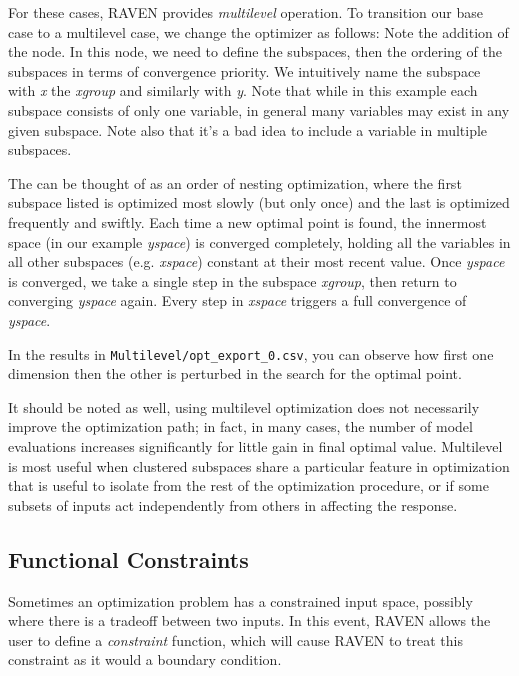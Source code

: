 For these cases, RAVEN provides \emph{multilevel} operation.  To transition our base case to a multilevel
case, we change the optimizer as follows:
Note the addition of the  node.  In this node, we need to define the subspaces, then the
ordering of the subspaces in terms of convergence priority.  We intuitively name the subspace with \emph{x}
the \emph{xgroup} and similarly with \emph{y}.  Note that while in this example each subspace consists of only
one variable, in general many variables may exist in any given subspace.  Note also that it's a bad idea to
include a variable in multiple subspaces.

The  can be thought of as an order of nesting optimization, where the first subspace listed
is optimized most slowly (but only once) and the last is optimized frequently and swiftly.  Each time a new
optimal point is found, the innermost space (in our example \emph{yspace}) is converged completely, holding all
the variables in all other subspaces (e.g. \emph{xspace}) constant at their most recent value.  Once
\emph{yspace} is converged, we take a single step in the subspace \emph{xgroup}, then return to converging
\emph{yspace} again.  Every step in \emph{xspace} triggers a full convergence of \emph{yspace}.

In the results in \texttt{Multilevel/opt\_export\_0.csv}, you can observe how first one dimension then the
other is perturbed in the search for the optimal point.

It should be noted as well, using multilevel optimization does not necessarily improve the optimization path;
in fact, in many cases, the number of model evaluations increases significantly for little gain in final
optimal value.  Multilevel is most useful when clustered subspaces share a particular feature in optimization
that is useful to isolate from the rest of the optimization procedure, or if some subsets of inputs act
independently from others in affecting the response.


\subsection{Functional Constraints} \label{subsec:opt explicit constraint}
Sometimes an optimization problem has a constrained input space, possibly where there is a tradeoff between
two inputs.  In this event, RAVEN allows the user to define a \emph{constraint} function, which will cause
RAVEN to treat this constraint as it would a boundary condition.

